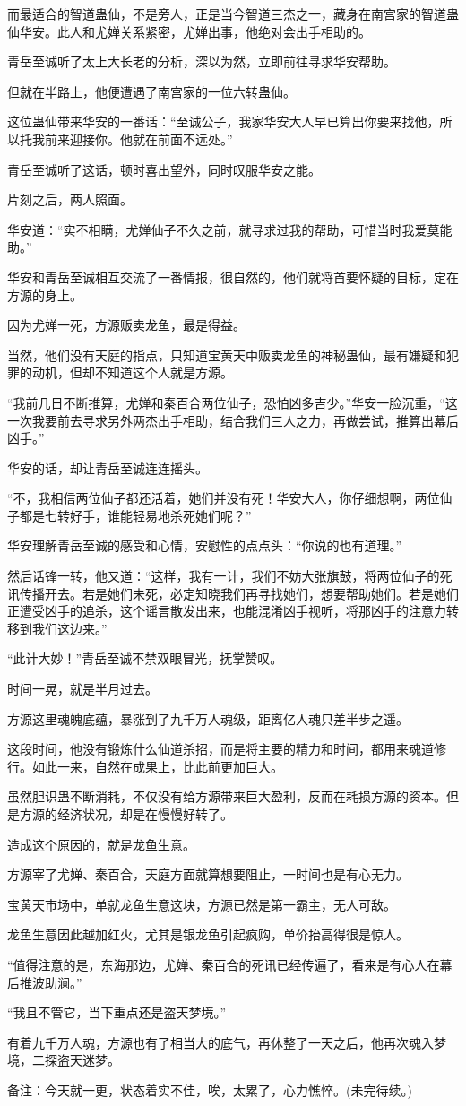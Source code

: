 \begin{this_body}
而最适合的智道蛊仙，不是旁人，正是当今智道三杰之一，藏身在南宫家的智道蛊仙华安。此人和尤婵关系紧密，尤婵出事，他绝对会出手相助的。

青岳至诚听了太上大长老的分析，深以为然，立即前往寻求华安帮助。

但就在半路上，他便遭遇了南宫家的一位六转蛊仙。

这位蛊仙带来华安的一番话：“至诚公子，我家华安大人早已算出你要来找他，所以托我前来迎接你。他就在前面不远处。”

青岳至诚听了这话，顿时喜出望外，同时叹服华安之能。

片刻之后，两人照面。

华安道：“实不相瞒，尤婵仙子不久之前，就寻求过我的帮助，可惜当时我爱莫能助。”

华安和青岳至诚相互交流了一番情报，很自然的，他们就将首要怀疑的目标，定在方源的身上。

因为尤婵一死，方源贩卖龙鱼，最是得益。

当然，他们没有天庭的指点，只知道宝黄天中贩卖龙鱼的神秘蛊仙，最有嫌疑和犯罪的动机，但却不知道这个人就是方源。

“我前几日不断推算，尤婵和秦百合两位仙子，恐怕凶多吉少。”华安一脸沉重，“这一次我要前去寻求另外两杰出手相助，结合我们三人之力，再做尝试，推算出幕后凶手。”

华安的话，却让青岳至诚连连摇头。

“不，我相信两位仙子都还活着，她们并没有死！华安大人，你仔细想啊，两位仙子都是七转好手，谁能轻易地杀死她们呢？”

华安理解青岳至诚的感受和心情，安慰性的点点头：“你说的也有道理。”

然后话锋一转，他又道：“这样，我有一计，我们不妨大张旗鼓，将两位仙子的死讯传播开去。若是她们未死，必定知晓我们再寻找她们，想要帮助她们。若是她们正遭受凶手的追杀，这个谣言散发出来，也能混淆凶手视听，将那凶手的注意力转移到我们这边来。”

“此计大妙！”青岳至诚不禁双眼冒光，抚掌赞叹。

时间一晃，就是半月过去。

方源这里魂魄底蕴，暴涨到了九千万人魂级，距离亿人魂只差半步之遥。

这段时间，他没有锻炼什么仙道杀招，而是将主要的精力和时间，都用来魂道修行。如此一来，自然在成果上，比此前更加巨大。

虽然胆识蛊不断消耗，不仅没有给方源带来巨大盈利，反而在耗损方源的资本。但是方源的经济状况，却是在慢慢好转了。

造成这个原因的，就是龙鱼生意。

方源宰了尤婵、秦百合，天庭方面就算想要阻止，一时间也是有心无力。

宝黄天市场中，单就龙鱼生意这块，方源已然是第一霸主，无人可敌。

龙鱼生意因此越加红火，尤其是银龙鱼引起疯购，单价抬高得很是惊人。

“值得注意的是，东海那边，尤婵、秦百合的死讯已经传遍了，看来是有心人在幕后推波助澜。”

“我且不管它，当下重点还是盗天梦境。”

有着九千万人魂，方源也有了相当大的底气，再休整了一天之后，他再次魂入梦境，二探盗天迷梦。

备注：今天就一更，状态着实不佳，唉，太累了，心力憔悴。(未完待续。)

\end{this_body}


